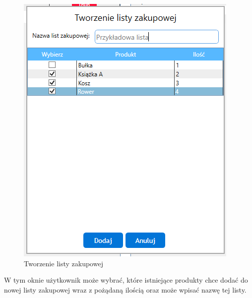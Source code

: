\documentclass[a4paper]{article}
\begin{document}
\begin{figure}[H]
\centering
\includegraphics[width=\textwidth,keepaspectratio]{img/modal-nowa-lista.png}
\caption{Tworzenie listy zakupowej}
\end{figure}
\begin{flushleft}
W tym oknie użytkownik może wybrać, które istniejące produkty chce dodać do nowej listy zakupowej wraz z pożądaną ilością oraz może wpisać nazwę tej listy.
\end{flushleft}
\end{document}

